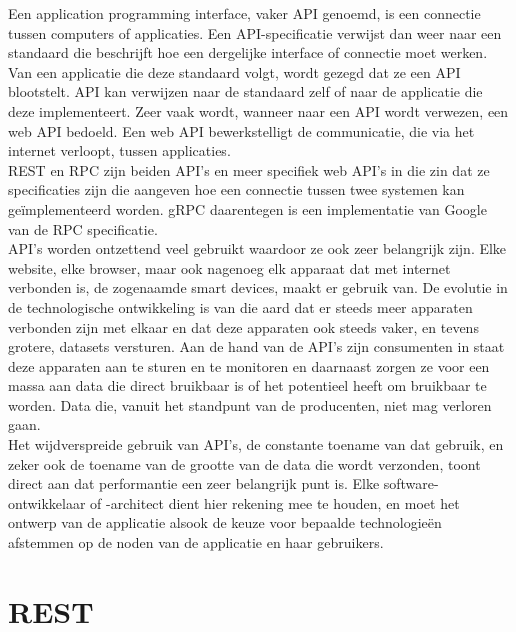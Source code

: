 Een application programming interface, vaker API genoemd, is een connectie tussen computers of applicaties.
Een API-specificatie verwijst dan weer naar een standaard die beschrijft hoe een dergelijke interface of connectie moet werken.
Van een applicatie die deze standaard volgt, wordt gezegd dat ze een API blootstelt. API kan verwijzen naar de standaard zelf of naar de applicatie die deze implementeert.
Zeer vaak wordt, wanneer naar een API wordt verwezen, een web API bedoeld. Een web API bewerkstelligt de communicatie, die via het internet verloopt, tussen applicaties.\\

REST en RPC zijn beiden API's en meer specifiek web API's in die zin dat ze specificaties zijn die aangeven hoe een connectie tussen twee systemen kan geïmplementeerd worden.
gRPC daarentegen is een implementatie van Google van de RPC specificatie.\\

API's worden ontzettend veel gebruikt waardoor ze ook zeer belangrijk zijn. Elke website, elke browser, maar ook nagenoeg elk apparaat dat met internet verbonden is,
de zogenaamde smart devices, maakt er gebruik van. De evolutie in de technologische ontwikkeling is van die aard dat er steeds meer apparaten verbonden zijn met elkaar
en dat deze apparaten ook steeds vaker, en tevens grotere, datasets versturen. Aan de hand van de API's zijn consumenten in staat deze apparaten aan te sturen en te monitoren
en daarnaast zorgen ze voor een massa aan data die direct bruikbaar is of het potentieel heeft om bruikbaar te worden. Data die, vanuit het standpunt van de producenten, niet mag verloren gaan.\\

Het wijdverspreide gebruik van API's, de constante toename van dat gebruik, en zeker ook de toename van de grootte van de data die wordt verzonden, toont
direct aan dat performantie een zeer belangrijk punt is. Elke software-ontwikkelaar of -architect dient hier rekening mee te houden, en moet het ontwerp van de
applicatie alsook de keuze voor bepaalde technologieën afstemmen op de noden van de applicatie en haar gebruikers.
~\autocite{cleo}

\section{REST}

